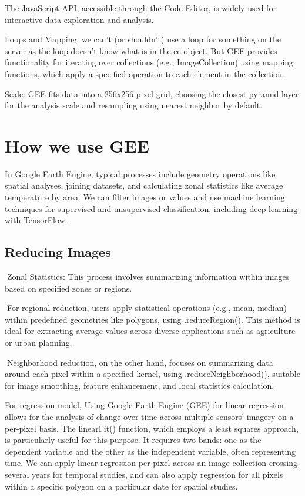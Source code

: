 \documentclass[
  letterpaper,
  DIV=11,
  numbers=noendperiod]{scrreprt}
\begin{document}
The JavaScript API, accessible through the Code Editor, is widely used
for interactive data exploration and analysis.

Loops and Mapping: we can't (or shouldn't) use a loop for something on
the server as the loop doesn't know what is in the ee object. But GEE
provides functionality for iterating over collections (e.g.,
ImageCollection) using mapping functions, which apply a specified
operation to each element in the collection.

Scale: GEE fits data into a 256x256 pixel grid, choosing the closest
pyramid layer for the analysis scale and resampling using nearest
neighbor by default.

\section{How we use GEE}\label{how-we-use-gee}

In Google Earth Engine, typical processes include geometry operations
like spatial analyses, joining datasets, and calculating zonal
statistics like average temperature by area. We can filter images or
values and use machine learning techniques for supervised and
unsupervised classification, including deep learning with TensorFlow.

\subsection{Reducing Images}\label{reducing-images}

Zonal Statistics: This process involves summarizing information within
images based on specified zones or regions.

For regional reduction, users apply statistical operations (e.g., mean,
median) within predefined geometries like polygons, using
.reduceRegion(). This method is ideal for extracting average values
across diverse applications such as agriculture or urban planning.

Neighborhood reduction, on the other hand, focuses on summarizing data
around each pixel within a specified kernel, using
.reduceNeighborhood(), suitable for image smoothing, feature
enhancement, and local statistics calculation.

For regression model, Using Google Earth Engine (GEE) for linear
regression allows for the analysis of change over time across multiple
sensors' imagery on a per-pixel basis. The linearFit() function, which
employs a least squares approach, is particularly useful for this
purpose. It requires two bands: one as the dependent variable and the
other as the independent variable, often representing time. We can apply
linear regression per pixel across an image collection crossing several
years for temporal studies, and can also apply regression for all pixels
within a specific polygon on a particular date for spatial studies.
\end{document}
